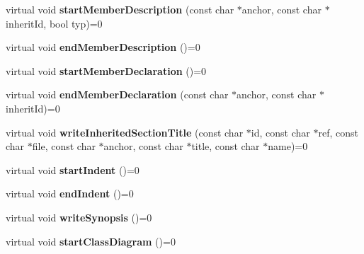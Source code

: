 \begin{DoxyCompactItemize}
\item 
\mbox{\label{class_output_generator_a787d70201a816f00853f2fd3e23a1321}} 
virtual void {\bfseries start\+Member\+Description} (const char $\ast$anchor, const char $\ast$inherit\+Id, bool typ)=0
\item 
\mbox{\label{class_output_generator_af7f56035354567686d15ab77e1f6f31d}} 
virtual void {\bfseries end\+Member\+Description} ()=0
\item 
\mbox{\label{class_output_generator_aeb5b5670178926771b6a649239f15444}} 
virtual void {\bfseries start\+Member\+Declaration} ()=0
\item 
\mbox{\label{class_output_generator_af22783eb794097cdfb783cfb29f60f3e}} 
virtual void {\bfseries end\+Member\+Declaration} (const char $\ast$anchor, const char $\ast$inherit\+Id)=0
\item 
\mbox{\label{class_output_generator_a272f99f415b7e8b6ead453cd9e714b8e}} 
virtual void {\bfseries write\+Inherited\+Section\+Title} (const char $\ast$id, const char $\ast$ref, const char $\ast$file, const char $\ast$anchor, const char $\ast$title, const char $\ast$name)=0
\item 
\mbox{\label{class_output_generator_a1fe795813bf725fb63b19a1cf463bdfa}} 
virtual void {\bfseries start\+Indent} ()=0
\item 
\mbox{\label{class_output_generator_a6d0ae2ff84f31ce7c3d964668dc31154}} 
virtual void {\bfseries end\+Indent} ()=0
\item 
\mbox{\label{class_output_generator_aa0d18fb8ce1251b97619c90061a697d8}} 
virtual void {\bfseries write\+Synopsis} ()=0
\item 
\mbox{\label{class_output_generator_af4dbb13368da9a7fee2c7ed3bb4bd8ea}} 
virtual void {\bfseries start\+Class\+Diagram} ()=0
\item 
\mbox{\label{class_output_generator_a72364e74e0d834f01c2b5f5db5665c77}} 

\end{DoxyCompactItemize}
